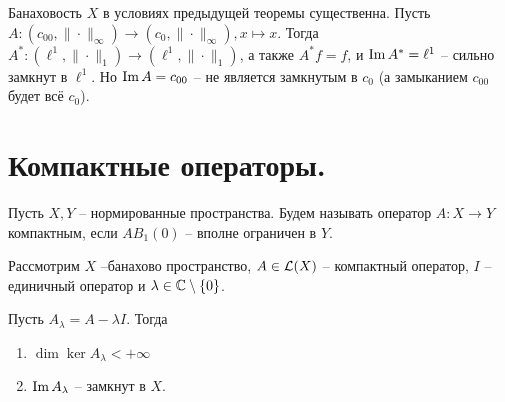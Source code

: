 \begin{example}
    Банаховость $X$ в условиях предыдущей теоремы существенна.
    Пусть $A\colon (c_{00}, \|\cdot\|_{\infty}) \to (c_0, \|\cdot\|_\infty), x \mapsto x$.
    Тогда $A^*\colon (\ell^1, \|\cdot\|_1) \to (\ell^1, \|\cdot\|_1)$, а также $A^*f = f$, и $\operatorname{Im} A^* = \ell^1$ -- сильно замкнут в $\ell^1$.
    Но $\operatorname{Im} A = c_{00}$ -- не является замкнутым в $c_0$ (а замыканием $c_{00}$ будет всё $c_0$).
\end{example}
\section{Компактные операторы.}
\begin{definition}
    Пусть $X, Y$ -- нормированные пространства.
    Будем называть оператор $A\colon X \to Y$ компактным, если $AB_1(0)$ -- вполне ограничен в $Y$.
\end{definition}
\begin{theorem}\label{th:finite-dimension-kernel}
    Рассмотрим $X$ --банахово пространство, $A \in \mathcal{L}(X)$ -- компактный оператор, $I$ -- единичный оператор и $\lambda \in \mathbb{C} \setminus \{0\}$.

    Пусть $A_\lambda = A - \lambda I$.
    Тогда
    \begin{enumerate}
        \item $\dim\ker A_\lambda <+\infty$
        \item $\operatorname{Im} A_\lambda$ -- замкнут в $X$.
    \end{enumerate}
\end{theorem}
